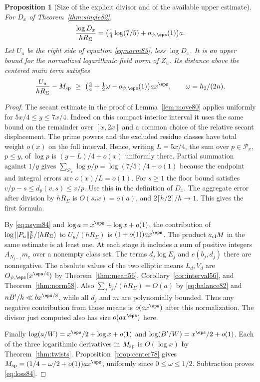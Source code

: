 \documentclass[a4paper,11pt]{article}
\newtheorem{proposition}{Proposition}[section]
\theoremstyle{definition}
\theoremstyle{remark}
\numberwithin{equation}{section}
\begin{document}
\begin{proposition}[Size of the explicit divisor and of the available upper estimate]
\label{prop:loss84}
For \(D_x\) of Theorem~\ref{thm:single82},
\[
   \frac{\log D_x}{hR_\Sigma}
       =\bigl(\tfrac14\log(7/5)+o_{\psi,\eps}(1)\bigr)a .
\]
Let \(U_u\) be the right side of equation \ref{eq:norm83},
less \(\log D_x\). It is an upper bound for the normalized
logarithmic field norm of \(Z_u\). Its distance above the
centered main term satisfies
\begin{equation}
 \frac{U_u}{hR_\Sigma}-M_{\rm sp}
     \ \ge\ \bigl(\tfrac34+\tfrac12\omega-o_{\psi,\eps}(1)\bigr)
                         a x^\eps,\qquad \omega=h_2/(2n).       \label{eq:loss84}
\end{equation}
\end{proposition}
\begin{proof}
The secant estimate in the proof of Lemma~\ref{lem:move80} applies
uniformly for \(5x/4\le y\le7x/4\). Indeed on this compact interior
interval it uses the same bound on the remainder over \([x,2x]\)
and a common choice of the relative secant displacement. The
prime powers and the excluded residue classes have total weight
\(o(x)\) on the full interval. Hence, writing \(L=5x/4\),
the sum over \(p\in\mathcal P_x\), \(p\le y\), of \(\log p\) is
\((y-L)/4+o(x)\) uniformly there. Partial summation against
\(1/y\) gives \(\sum_{\mathcal P_x}\log p/p=\log(7/5)/4+o(1)\)
because the endpoint and integral errors are \(o(x)/L=o(1)\).
For \(s\ge1\) the floor bound satisfies
\(v/p-s\le d_p(v,s)\le v/p\). Use this in the definition of
\(D_x\). The aggregate error after division by \(hR_\Sigma\)
is \(O(s_*x)=o(a)\), and \(2\lceil h/2\rceil/h\to1\).
This gives the first formula.

By \eqref{eq:asym84} and \(\log a=x^\eps+\log x+o(1)\),
the contribution of \(\log\|P_u\|_{\rm F}^2/(hR_\Sigma)\) to
\(U_u/(hR_\Sigma)\) is \((1+o(1))ax^\eps\).
The product \(a_{\rm cl}M\) in the same estimate is at
least one. At each stage it includes a sum of positive integers
\(A_{N_{j-1}}m_c\) over a nonempty class set. The terms
\(d_j\log E_j\) and \(e(b_j,d_j)\) there are nonnegative.
The absolute values of the two elliptic means \(L_d,V_d\)
are \(O_{\psi,\eps}(x^{\eps/4})\) by Theorem~\ref{thm:mean56},
Corollary~\ref{cor:interval56}, and Theorem~\ref{thm:norm58}.
Also \(\sum_j b_j/(hR_\Sigma)=O(a)\) by \eqref{eq:balance82}
and \(nB'/h\ll b x^{\eps/8}\), while all \(d_j\) and \(m\)
are polynomially bounded. Thus any negative contribution from
those means is \(o(ax^\eps)\) after this normalization.
The divisor just computed also has size \(o(ax^\eps)\) here.

Finally \(\log(a/W)=x^\eps/2+\log x+o(1)\) and
\(\log(B'/W)=x^\eps/2+o(1)\). Each of the three logarithmic
derivatives in \(M_{\rm sp}\) is \(O(\log x)\) by
Theorem~\ref{thm:twists}. Proposition~\ref{prop:center78} gives
\(M_{\rm sp}=(1/4-\omega/2+o(1))a x^\eps\), uniformly since
\(0\le\omega\le1/2\). Subtraction proves \eqref{eq:loss84}.
\end{proof}
\end{document}
